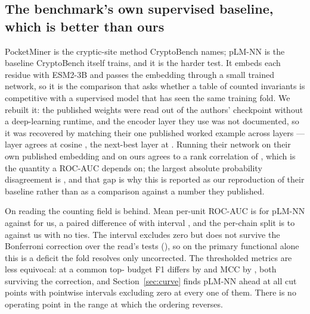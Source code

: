 \documentclass[11pt]{article}
\begin{document}
\subsection{The benchmark's own supervised baseline, which is better than ours}
\label{sec:plmnn}
PocketMiner is the cryptic-site method CryptoBench names; pLM-NN is the baseline
CryptoBench itself trains, and it is the harder test. It embeds each residue with
ESM2-3B and passes the embedding through a small trained network, so it is the
comparison that asks whether a table of counted invariants is competitive with a
supervised model that has seen the same training fold. We rebuilt it: the
published weights were read out of the authors' checkpoint without a deep-learning
runtime, and the encoder layer they use was not documented, so it was recovered by
matching their one published worked example across layers --- layer
\PlmLayer{} agrees at cosine \PlmFidelity{}, the next-best layer at
\PlmFidelityNext{}. Running their network on their own published embedding and on
ours agrees to a rank correlation of \PlmRank{}, which is the quantity a ROC-AUC
depends on; the largest absolute probability disagreement is \PlmMaxDp{}, and that
gap is why this is reported as our reproduction of their baseline rather than as a
comparison against a number they published.

On reading \PlmReadIndex{} the counting field is behind. Mean per-unit ROC-AUC is
\PlmLevel{} for pLM-NN against \TabAuc{} for us, a paired difference of
\PlmAucDelta{} with interval \PlmAucCI{}, and the per-chain split is
\PlmWin{} to \PlmLoss{} against us with no ties. The interval excludes zero but
does not survive the Bonferroni correction over the read's \PlmNTests{} tests
(\PlmAucBonf{}), so on the primary functional alone this is a deficit the fold
resolves only uncorrected. The thresholded metrics are less equivocal: at a common
top-\MatchOurQ{} budget F1 differs by \PlmBudgetFDelta{} \PlmBudgetFCI{} and MCC
by \PlmBudgetMDelta{} \PlmBudgetMCI{}, both surviving the correction, and
Section~\ref{sec:curve} finds pLM-NN ahead at all \CvN{} cut points with
pointwise intervals excluding zero at every one of them. There is no operating
point in the range at which the ordering reverses.
\end{document}
